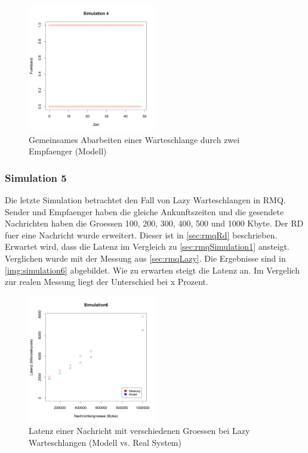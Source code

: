 \begin{figure}
\center
  \includegraphics[width=0.5\textwidth]{images/modelSimulationResults/simulation4.png}
  \caption{Gemeinsames Abarbeiten einer Warteschlange durch zwei Empfaenger (Modell)}
  \label{img:simulation4}
\end{figure}



\subsubsection{Simulation 5}
Die letzte Simulation betrachtet den Fall von Lazy Warteschlangen in RMQ. Sender und Empfaenger haben die gleiche Ankunftszeiten und die gesendete Nachrichten haben die Groessen 100, 200, 300, 400, 500 und 1000 Kbyte. Der RD fuer eine Nachricht wurde erweitert. Dieser ist in \autoref{sec:rmqRd} beschrieben. Erwartet wird, dass die Latenz im Vergleich zu \autoref{sec:rmqSimulation1} ansteigt. Verglichen wurde mit der Messung aus \autoref{sec:rmqLazy}.
Die Ergebnisse sind in \autoref{img:simulation6} abgebildet. Wie zu erwarten steigt die Latenz an. Im Vergelich zur realen Messung liegt der Unterschied bei x Prozent.
\begin{figure}
\center
  \includegraphics[width=0.5\textwidth]{images/modelSimulationResults/simulation6.png}
  \caption{Latenz einer Nachricht mit verschiedenen Groessen bei Lazy Warteschlangen (Modell vs. Real System)}
  \label{img:simulation6}
\end{figure}


